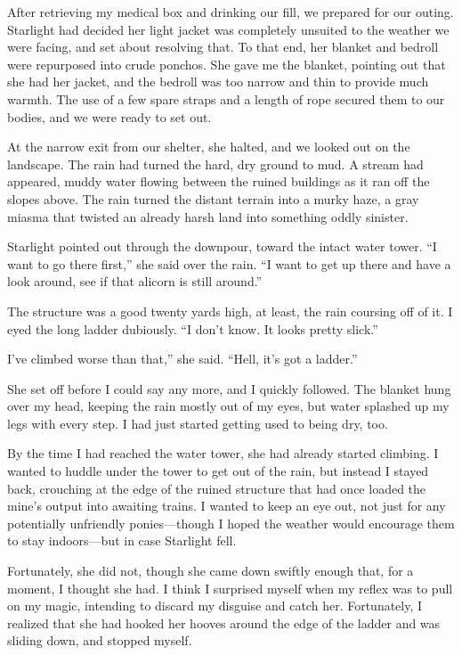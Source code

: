 After retrieving my medical box and drinking our fill, we prepared for our outing. Starlight had decided her light jacket was completely unsuited to the weather we were facing, and set about resolving that. To that end, her blanket and bedroll were repurposed into crude ponchos. She gave me the blanket, pointing out that she had her jacket, and the bedroll was too narrow and thin to provide much warmth. The use of a few spare straps and a length of rope secured them to our bodies, and we were ready to set out.

At the narrow exit from our shelter, she halted, and we looked out on the landscape. The rain had turned the hard, dry ground to mud. A stream had appeared, muddy water flowing between the ruined buildings as it ran off the slopes above. The rain turned the distant terrain into a murky haze, a gray miasma that twisted an already harsh land into something oddly sinister.

Starlight pointed out through the downpour, toward the intact water tower. “I want to go there first,” she said over the rain. “I want to get up there and have a look around, see if that alicorn is still around.”

The structure was a good twenty yards high, at least, the rain coursing off of it. I eyed the long ladder dubiously. “I don’t know. It looks pretty slick.”

\leavevmode{}I’ve climbed worse than that,” she said. “Hell, it’s got a ladder.”

She set off before I could say any more, and I quickly followed. The blanket hung over my head, keeping the rain mostly out of my eyes, but water splashed up my legs with every step. I had just started getting used to being dry, too.

By the time I had reached the water tower, she had already started climbing. I wanted to huddle under the tower to get out of the rain, but instead I stayed back, crouching at the edge of the ruined structure that had once loaded the mine’s output into awaiting trains. I wanted to keep an eye out, not just for any potentially unfriendly ponies—though I hoped the weather would encourage them to stay indoors—but in case Starlight fell.

Fortunately, she did not, though she came down swiftly enough that, for a moment, I thought she had. I think I surprised myself when my reflex was to pull on my magic, intending to discard my disguise and catch her. Fortunately, I realized that she had hooked her hooves around the edge of the ladder and was sliding down, and stopped myself.


